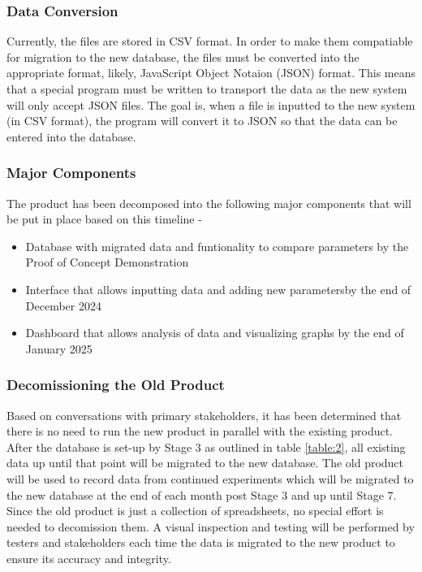 \documentclass[12pt]{article}
\begin{document}
\subsubsection{Data Conversion}
\label{data}
Currently, the files are stored in CSV format. In order to make them compatiable for migration to the new database, the files must be converted into the appropriate format, likely, 
JavaScript Object Notaion (JSON) format. This means that a special program must be written to transport the data as the new system will only accept JSON files. 
The goal is, when a file is inputted to the new system (in CSV format), the program will convert it to JSON so that the data can be entered into the database.

\subsubsection{Major Components}
The product has been decomposed into the following major components that will be put in place based on this timeline - 
\begin{itemize}
  \item Database with migrated data and funtionality to compare parameters by the Proof of Concept Demonstration
  \item Interface that allows inputting data and adding new parametersby the end of December 2024
  \item Dashboard that allows analysis of data and visualizing graphs by the end of January 2025
\end{itemize}

\subsubsection{Decomissioning the Old Product}
Based on conversations with primary stakeholders, it has been determined that there is no need to run the new product in parallel with the existing product. After the database is set-up
by Stage 3 as outlined in table \ref{table:2}, all existing data up until that point will be migrated to the new database. The old product will be used to record data from continued experiments
which will be migrated to the new database at the end of each month post Stage 3 and up until Stage 7.\\
\newline
Since the old product is just a collection of spreadsheets, no special effort is needed to decomission them. A visual inspection and testing will be performed by testers and stakeholders 
each time the data is migrated to the new product to ensure its accuracy and integrity.
\end{document}
